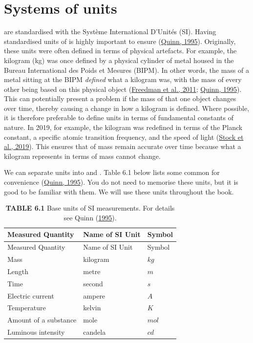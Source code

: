 \documentclass[
  openany]{krantz}
\begin{document}
\hypertarget{systems-of-units}{%
\section{Systems of units}\label{systems-of-units}}

 are standardised with the Système International D'Unités (SI).
Having standardised units of  is highly important to ensure   (\protect\hyperlink{ref-Quinn1995}{Quinn, 1995}).
Originally, these units were often defined in terms of physical artefacts.
For example, the kilogram (kg) was once defined by a physical cylinder of metal housed in the Bureau International des Poids et Mesures (BIPM).
In other words, the mass of a metal sitting at the BIPM \emph{defined} what a kilogram was, with the mass of every other  being based on this physical object (\protect\hyperlink{ref-Freedman2011}{Freedman et al., 2011}; \protect\hyperlink{ref-Quinn1995}{Quinn, 1995}).
This can potentially present a problem if the mass of that one object changes over time, thereby causing a change in how a kilogram is defined.
Where possible, it is therefore preferable to define units in terms of fundamental constants of nature.
In 2019, for example, the kilogram was redefined in terms of the Planck constant, a specific atomic transition frequency, and the speed of light (\protect\hyperlink{ref-Stock2019}{Stock et al., 2019}).
This ensures that  of mass remain accurate over time because what a kilogram represents in terms of mass cannot change.

We can separate units into  and .
Table 6.1 below lists some common  for convenience (\protect\hyperlink{ref-Quinn1995}{Quinn, 1995}).
You do not need to memorise these units, but it is good to be familiar with them.
We will use these units throughout the book.

\begin{longtable}[]{@{}lll@{}}
\caption{\textbf{TABLE 6.1} Base units of SI measurements. For details see Quinn (\protect\hyperlink{ref-Quinn1995}{1995}).}\tabularnewline
\toprule
Measured Quantity & Name of SI Unit & Symbol \\
\midrule
\endfirsthead
\toprule
Measured Quantity & Name of SI Unit & Symbol \\
\midrule
\endhead
Mass & kilogram & \(kg\) \\
Length & metre & \(m\) \\
Time & second & \(s\) \\
Electric current & ampere & \(A\) \\
Temperature & kelvin & \(K\) \\
Amount of a substance & mole & \(mol\) \\
Luminous intensity & candela & \(cd\) \\
\bottomrule
\end{longtable}
\end{document}
